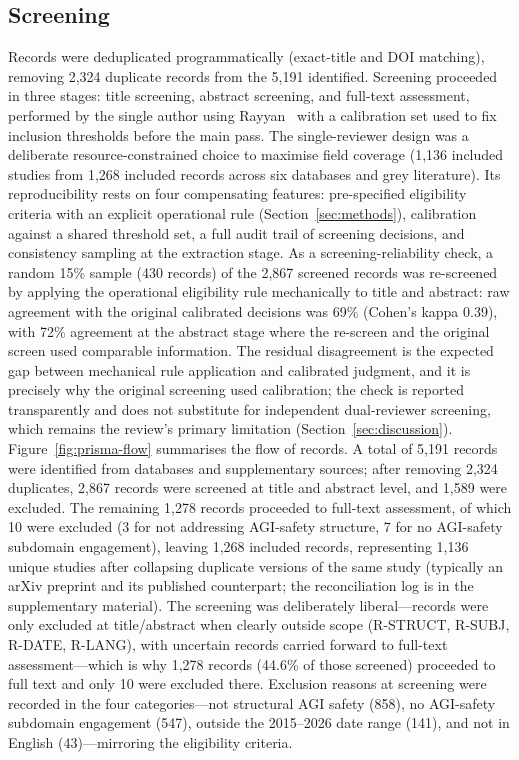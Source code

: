 \subsection{Screening}
Records were deduplicated programmatically (exact-title and DOI matching), removing 2,324 duplicate records from the 5,191 identified. Screening proceeded in three stages: title screening, abstract screening, and full-text assessment, performed by the single author using Rayyan~\cite{ouzzani2016rayyan} with a calibration set used to fix inclusion thresholds before the main pass. The single-reviewer design was a deliberate resource-constrained choice to maximise field coverage (1,136 included studies from 1,268 included records across six databases and grey literature). Its reproducibility rests on four compensating features: pre-specified eligibility criteria with an explicit operational rule (Section~\ref{sec:methods}), calibration against a shared threshold set, a full audit trail of screening decisions, and consistency sampling at the extraction stage. As a screening-reliability check, a random 15\% sample (430 records) of the 2,867 screened records was re-screened by applying the operational eligibility rule mechanically to title and abstract: raw agreement with the original calibrated decisions was 69\% (Cohen's kappa 0.39), with 72\% agreement at the abstract stage where the re-screen and the original screen used comparable information. The residual disagreement is the expected gap between mechanical rule application and calibrated judgment, and it is precisely why the original screening used calibration; the check is reported transparently and does not substitute for independent dual-reviewer screening, which remains the review's primary limitation (Section~\ref{sec:discussion}). Figure~\ref{fig:prisma-flow} summarises the flow of records. A total of 5,191 records were identified from databases and supplementary sources; after removing 2,324 duplicates, 2,867 records were screened at title and abstract level, and 1,589 were excluded. The remaining 1,278 records proceeded to full-text assessment, of which 10 were excluded (3 for not addressing AGI-safety structure, 7 for no AGI-safety subdomain engagement), leaving 1,268 included records, representing 1,136 unique studies after collapsing duplicate versions of the same study (typically an arXiv preprint and its published counterpart; the reconciliation log is in the supplementary material). The screening was deliberately liberal---records were only excluded at title/abstract when clearly outside scope (R-STRUCT, R-SUBJ, R-DATE, R-LANG), with uncertain records carried forward to full-text assessment---which is why 1,278 records (44.6\% of those screened) proceeded to full text and only 10 were excluded there. Exclusion reasons at screening were recorded in the four categories---not structural AGI safety (858), no AGI-safety subdomain engagement (547), outside the 2015--2026 date range (141), and not in English (43)---mirroring the eligibility criteria.

